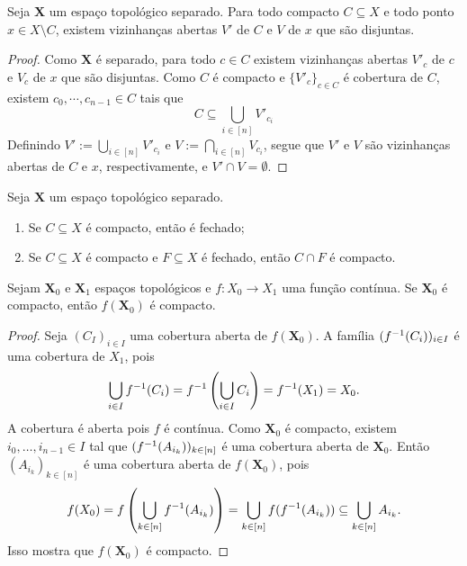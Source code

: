 \begin{proposition}
\label{topo:prop.esp.sep.comp.pont}
Seja $\bm X$ um espaço topológico separado. Para todo compacto $C \subseteq X$ e todo ponto $x \in X \setminus C$, existem vizinhanças abertas $V'$ de $C$ e $V$ de $x$ que são disjuntas.
\end{proposition}
\begin{proof}
Como $\bm X$ é separado, para todo $c \in C$ existem vizinhanças abertas $V'_c$ de $c$ e $V_c$ de $x$ que são disjuntas. Como $C$ é compacto e $\{V'_c\}_{c \in C}$ é cobertura de $C$, existem $c_0,\cdots,c_{n-1} \in C$ tais que
	\begin{equation*}
	C \subseteq \bigcup_{i \in [n]} V'_{c_i}
	\end{equation*}
Definindo $V' := \bigcup_{i \in [n]} V'_{c_i}$ e $V := \bigcap_{i \in [n]} V_{c_i}$, segue que $V'$ e $V$ são vizinhanças abertas de $C$ e $x$, respectivamente, e $V' \cap V = \emptyset$.
\end{proof}

\begin{proposition}
Seja $\bm X$ um espaço topológico separado.
	\begin{enumerate}
	\item Se $C \subseteq X$ é compacto, então é fechado;
	\item Se $C \subseteq X$ é compacto e $F \subseteq X$ é fechado, então $C \cap F$ é compacto.
	\end{enumerate}
\end{proposition}

\begin{proposition}
Sejam $\bm X_0$ e $\bm X_1$ espaços topológicos e $f\colon X_0 \to X_1$ uma função contínua. Se $\bm X_0$ é compacto, então $f(\bm X_0)$ é compacto.
\end{proposition}
\begin{proof}
Seja $(C_I)_{i \in I}$ uma cobertura aberta de $f(\bm X_0)$. A família $(f^{-1}(C_i))_{i \in I}$ é  uma cobertura de $X_1$, pois
	\begin{equation*}
	\bigcup_{i \in I}f^{-1}(C_i) = f^{-1}\left(\bigcup_{i \in I}C_i\right) = f^{-1}(X_1) = X_0.
	\end{equation*}
A cobertura é aberta pois $f$ é contínua. Como $\bm X_0$ é compacto, existem $i_0, \ldots, i_{n-1} \in I$ tal que $(f^{-1}(A_{i_k}))_{k \in [n]}$ é uma cobertura aberta de $\bm X_0$. Então $(A_{i_k})_{k \in [n]}$ é uma cobertura aberta de $f(\bm X_0)$, pois
	\begin{equation*}
	f(X_0) = f\left(\bigcup_{k \in [n]} f ^{-1}(A_{i_k})\right) = \bigcup_{k \in [n]} f(f^{-1}(A_{i_k})) \subseteq  \bigcup_{k \in [n]} A_{i_k}.
	\end{equation*}
Isso mostra que $f(\bm X_0)$ é compacto.
\end{proof}


